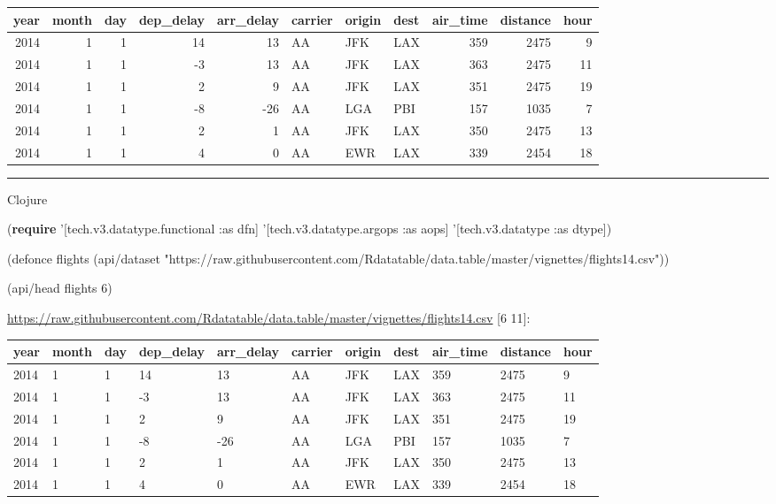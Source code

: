 \documentclass[]{article}
\newenvironment{Shaded}{\begin{snugshade}}{\end{snugshade}}
\newcommand{\AttributeTok}[1]{\textcolor[rgb]{0.77,0.63,0.00}{#1}}
\newcommand{\BuiltInTok}[1]{#1}
\newcommand{\DecValTok}[1]{\textcolor[rgb]{0.00,0.00,0.81}{#1}}
\newcommand{\FunctionTok}[1]{\textcolor[rgb]{0.00,0.00,0.00}{#1}}
\newcommand{\KeywordTok}[1]{\textcolor[rgb]{0.13,0.29,0.53}{\textbf{#1}}}
\newcommand{\NormalTok}[1]{#1}
\newcommand{\StringTok}[1]{\textcolor[rgb]{0.31,0.60,0.02}{#1}}
\begin{document}
\begin{longtable}[]{@{}rrrrrlllrrr@{}}
\toprule
year & month & day & dep\_delay & arr\_delay & carrier & origin & dest &
air\_time & distance & hour\tabularnewline
\midrule
\endhead
2014 & 1 & 1 & 14 & 13 & AA & JFK & LAX & 359 & 2475 & 9\tabularnewline
2014 & 1 & 1 & -3 & 13 & AA & JFK & LAX & 363 & 2475 & 11\tabularnewline
2014 & 1 & 1 & 2 & 9 & AA & JFK & LAX & 351 & 2475 & 19\tabularnewline
2014 & 1 & 1 & -8 & -26 & AA & LGA & PBI & 157 & 1035 & 7\tabularnewline
2014 & 1 & 1 & 2 & 1 & AA & JFK & LAX & 350 & 2475 & 13\tabularnewline
2014 & 1 & 1 & 4 & 0 & AA & EWR & LAX & 339 & 2454 & 18\tabularnewline
\bottomrule
\end{longtable}

\begin{center}\rule{0.5\linewidth}{0.5pt}\end{center}

Clojure

\begin{Shaded}
\begin{Highlighting}[]
\NormalTok{(}\KeywordTok{require}\NormalTok{ '[tech.v3.datatype.functional }\AttributeTok{:as}\NormalTok{ dfn]}
\NormalTok{         '[tech.v3.datatype.argops }\AttributeTok{:as}\NormalTok{ aops]}
\NormalTok{         '[tech.v3.datatype }\AttributeTok{:as}\NormalTok{ dtype])}

\NormalTok{(}\BuiltInTok{defonce}\FunctionTok{ flights }\NormalTok{(api/dataset }\StringTok{"https://raw.githubusercontent.com/Rdatatable/data.table/master/vignettes/flights14.csv"}\NormalTok{))}
\end{Highlighting}
\end{Shaded}

\begin{Shaded}
\begin{Highlighting}[]
\NormalTok{(api/head flights }\DecValTok{6}\NormalTok{)}
\end{Highlighting}
\end{Shaded}

\url{https://raw.githubusercontent.com/Rdatatable/data.table/master/vignettes/flights14.csv}
{[}6 11{]}:

\begin{longtable}[]{@{}lllllllllll@{}}
\toprule
year & month & day & dep\_delay & arr\_delay & carrier & origin & dest &
air\_time & distance & hour\tabularnewline
\midrule
\endhead
2014 & 1 & 1 & 14 & 13 & AA & JFK & LAX & 359 & 2475 & 9\tabularnewline
2014 & 1 & 1 & -3 & 13 & AA & JFK & LAX & 363 & 2475 & 11\tabularnewline
2014 & 1 & 1 & 2 & 9 & AA & JFK & LAX & 351 & 2475 & 19\tabularnewline
2014 & 1 & 1 & -8 & -26 & AA & LGA & PBI & 157 & 1035 & 7\tabularnewline
2014 & 1 & 1 & 2 & 1 & AA & JFK & LAX & 350 & 2475 & 13\tabularnewline
2014 & 1 & 1 & 4 & 0 & AA & EWR & LAX & 339 & 2454 & 18\tabularnewline
\bottomrule
\end{longtable}
\end{document}
